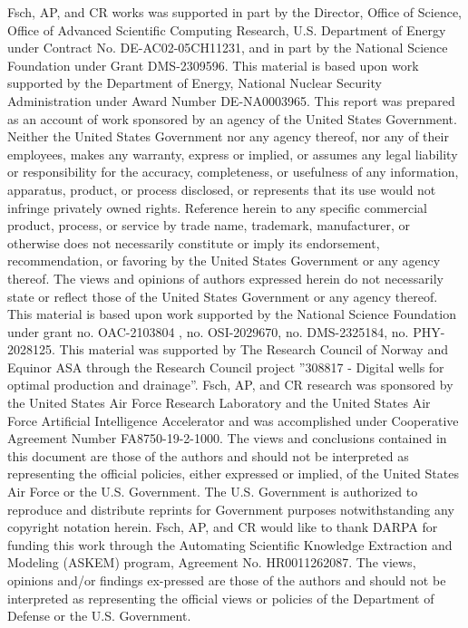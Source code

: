 Fsch, AP, and CR works was supported in part by the Director, Office of Science, Office of Advanced Scientific Computing Research, U.S. Department of Energy under Contract No. DE-AC02-05CH11231, and in part by the National Science Foundation under Grant DMS-2309596.
This material is based upon work supported by the Department of Energy, National Nuclear Security Administration under Award Number DE-NA0003965.
This report was prepared as an account of work sponsored by an agency of the United States Government. 
Neither the United States Government nor any agency thereof, nor any of their employees, makes any warranty, express or implied, or assumes any legal liability or responsibility for the accuracy, completeness, or usefulness of any information, apparatus, product, or process disclosed, or represents that its use would not infringe privately owned rights. 
Reference herein to any specific commercial product, process, or service by trade name, trademark, manufacturer, or otherwise does not necessarily constitute or imply its endorsement, recommendation, or favoring by the United States Government or any agency thereof. 
The views and opinions of authors expressed herein do not necessarily state or reflect those of the United States Government or any agency thereof. 
This material is based upon work supported by the National Science Foundation under grant no. OAC-2103804 , no. OSI-2029670, no. DMS-2325184, no. PHY-2028125. 
This material was supported by The Research Council of Norway and Equinor ASA through the Research Council project ”308817 - Digital wells for optimal production and drainage”. 
Fsch, AP, and CR research was sponsored by the United States Air Force Research Laboratory and the United States Air Force Artificial Intelligence Accelerator and was accomplished under Cooperative Agreement Number FA8750-19-2-1000. 
The views and conclusions contained in this document are those of the authors and should not be interpreted as representing the official policies, either expressed or implied, of the United States Air Force or the U.S. Government. 
The U.S. Government is authorized to reproduce and distribute reprints for Government purposes notwithstanding any copyright notation herein. 
Fsch, AP, and CR  would like to thank DARPA for funding this work through the Automating Scientific Knowledge Extraction and Modeling (ASKEM) program, Agreement No. HR0011262087. The views, opinions and/or findings ex-pressed are those of the authors and should not be interpreted as representing the official views or policies of the Department of Defense or the U.S. Government.

